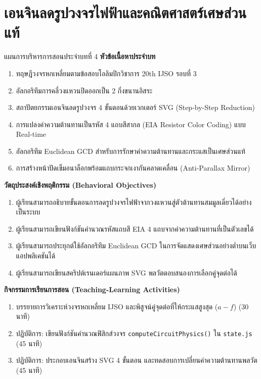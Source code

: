 \chapter{เอนจินลดรูปวงจรไฟฟ้าและคณิตศาสตร์เศษส่วนแท้}
\label{chap:ch04}

\begin{teachingplan}{แผนการบริหารการสอนประจำบทที่ 4}
\noindent\textbf{หัวข้อเนื้อหาประจำบท}
\begin{enumerate}[leftmargin=1.5em, itemsep=2pt]
    \item ทฤษฎีวงจรหกเหลี่ยมตามข้อสอบโอลิมปิกวิชาการ 20th IJSO รอบที่ 3
    \item อัลกอริทึมการคลี่วงแหวนปิดออกเป็น 2 กิ่งขนานอิสระ
    \item สถาปัตยกรรมเอนจินลดรูปวงจร 4 ขั้นตอนด้วยเวกเตอร์ SVG (Step-by-Step Reduction)
    \item การแปลงค่าความต้านทานเป็นรหัส 4 แถบสีสากล (EIA Resistor Color Coding) แบบ Real-time
    \item อัลกอริทึม Euclidean GCD สำหรับการรักษาค่าความต้านทานและกระแสเป็นเศษส่วนแท้
    \item การสร้างหน้าปัดเข็มอนาล็อกพร้อมแถบกระจกเงากันคลาดเคลื่อน (Anti-Parallax Mirror)
\end{enumerate}

\noindent\textbf{วัตถุประสงค์เชิงพฤติกรรม (Behavioral Objectives)}
\begin{enumerate}[leftmargin=1.5em, itemsep=2pt]
    \item ผู้เรียนสามารถอธิบายขั้นตอนการลดรูปวงจรไฟฟ้าจากวงแหวนสู่ตัวต้านทานสมมูลเดี่ยวได้อย่างเป็นระบบ
    \item ผู้เรียนสามารถเขียนฟังก์ชันคำนวณรหัสแถบสี EIA 4 แถบจากค่าความต้านทานที่เป็นตัวเลขได้
    \item ผู้เรียนสามารถประยุกต์ใช้อัลกอริทึม Euclidean GCD ในการจัดแสดงเศษส่วนอย่างต่ำบนเว็บแอปพลิเคชันได้
    \item ผู้เรียนสามารถเขียนสคริปต์เรนเดอร์แผนภาพ SVG พลวัตตอบสนองการเลือกคู่จุดต่อได้
\end{enumerate}

\noindent\textbf{กิจกรรมการเรียนการสอน (Teaching-Learning Activities)}
\begin{enumerate}[leftmargin=1.5em, itemsep=2pt]
    \item บรรยายการวิเคราะห์วงจรหกเหลี่ยม IJSO และพิสูจน์คู่จุดต่อที่ให้กระแสสูงสุด ($a-f$) (30 นาที)
    \item ปฏิบัติการ: เขียนฟังก์ชันคำนวณฟิสิกส์วงจร \texttt{computeCircuitPhysics()} ใน \texttt{state.js} (45 นาที)
    \item ปฏิบัติการ: ประกอบเอนจินสร้าง SVG 4 ขั้นตอน และทดสอบการเปลี่ยนค่าความต้านทานพลวัต (45 นาที)
\end{enumerate}


\end{teachingplan}
